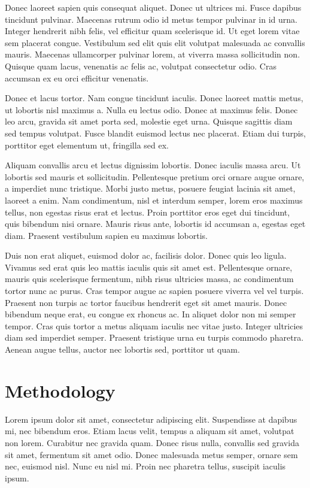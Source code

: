 Donec laoreet sapien quis consequat aliquet. Donec ut ultrices mi. Fusce dapibus tincidunt pulvinar. Maecenas rutrum odio id metus tempor pulvinar in id urna. Integer hendrerit nibh felis, vel efficitur quam scelerisque id. Ut eget lorem vitae sem placerat congue. Vestibulum sed elit quis elit volutpat malesuada ac convallis mauris. Maecenas ullamcorper pulvinar lorem, at viverra massa sollicitudin non. Quisque quam lacus, venenatis ac felis ac, volutpat consectetur odio. Cras accumsan ex eu orci efficitur venenatis.

Donec et lacus tortor. Nam congue tincidunt iaculis. Donec laoreet mattis metus, ut lobortis nisl maximus a. Nulla eu lectus odio. Donec at maximus felis. Donec leo arcu, gravida sit amet porta sed, molestie eget urna. Quisque sagittis diam sed tempus volutpat. Fusce blandit euismod lectus nec placerat. Etiam dui turpis, porttitor eget elementum ut, fringilla sed ex.

Aliquam convallis arcu et lectus dignissim lobortis. Donec iaculis massa arcu. Ut lobortis sed mauris et sollicitudin. Pellentesque pretium orci ornare augue ornare, a imperdiet nunc tristique. Morbi justo metus, posuere feugiat lacinia sit amet, laoreet a enim. Nam condimentum, nisl et interdum semper, lorem eros maximus tellus, non egestas risus erat et lectus. Proin porttitor eros eget dui tincidunt, quis bibendum nisi ornare. Mauris risus ante, lobortis id accumsan a, egestas eget diam. Praesent vestibulum sapien eu maximus lobortis.

Duis non erat aliquet, euismod dolor ac, facilisis dolor. Donec quis leo ligula. Vivamus sed erat quis leo mattis iaculis quis sit amet est. Pellentesque ornare, mauris quis scelerisque fermentum, nibh risus ultricies massa, ac condimentum tortor nunc ac purus. Cras tempor augue ac sapien posuere viverra vel vel turpis. Praesent non turpis ac tortor faucibus hendrerit eget sit amet mauris. Donec bibendum neque erat, eu congue ex rhoncus ac. In aliquet dolor non mi semper tempor. Cras quis tortor a metus aliquam iaculis nec vitae justo. Integer ultricies diam sed imperdiet semper. Praesent tristique urna eu turpis commodo pharetra. Aenean augue tellus, auctor nec lobortis sed, porttitor ut quam.

\section{Methodology}
Lorem ipsum dolor sit amet, consectetur adipiscing elit. Suspendisse at dapibus mi, nec bibendum eros. Etiam lacus velit, tempus a aliquam sit amet, volutpat non lorem. Curabitur nec gravida quam. Donec risus nulla, convallis sed gravida sit amet, fermentum sit amet odio. Donec malesuada metus semper, ornare sem nec, euismod nisl. Nunc eu nisl mi. Proin nec pharetra tellus, suscipit iaculis ipsum.

